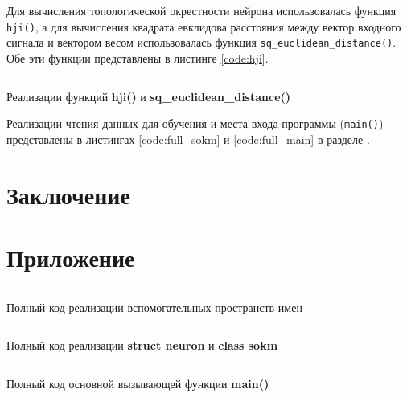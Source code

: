\documentclass[a4paper,12pt]{report}
\begin{document}
Для вычисления топологической окрестности нейрона использовалась
функция \verb|hji()|, а для вычисления квадрата евклидова расстояния
между вектор входного сигнала и вектором весом использовалась функция
\verb|sq_euclidean_distance()|. Обе эти функции представлены в листинге
\ref{code:hji}.

\begin{longlisting}
    \inputminted{cpp}{code/train.hpp}
    \caption{Реализации функций \textbf{hji()} и \textbf{sq\_euclidean\_distance()}}
    \label{code:hji}
\end{longlisting}
\vspace{5mm}

Реализации чтения данных для обучения и места входа программы (\verb|main()|)
представлены в листингах \ref{code:full_sokm}
и \ref{code:full_main} в разделе .

\chapter{Заключение}


\chapter{Приложение} \label{sec:appendix}

\begin{longlisting}
    \inputminted{cpp}{code/utils.hpp}
    \caption{Полный код реализации вспомогательных пространств имен}
    \label{code:full_utils}
\end{longlisting}
\vspace{5mm}

\begin{longlisting}
    \inputminted{cpp}{code/sokm.hpp}
    \caption{Полный код реализации \textbf{struct neuron} и \textbf{class sokm}}
    \label{code:full_sokm}
\end{longlisting}
\vspace{5mm}

\begin{longlisting}
    \inputminted{cpp}{code/main.cpp}
    \caption{Полный код основной вызывающей функции \textbf{main()}}
    \label{code:full_main}
\end{longlisting}
\vspace{5mm}
\end{document}
